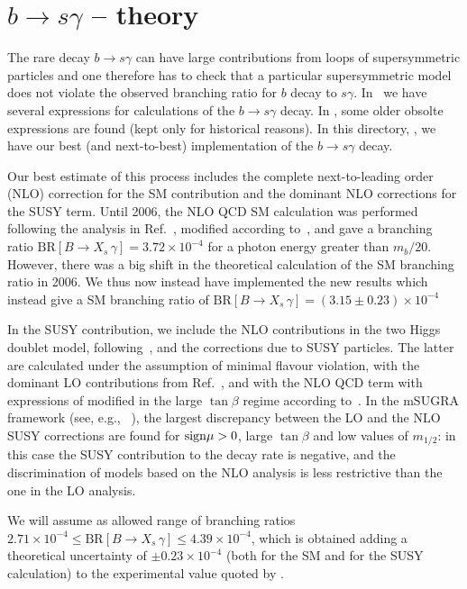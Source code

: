 
\section{$b \rightarrow s \gamma$ -- theory}

The rare decay $b \rightarrow s \gamma$ can have large contributions
from loops of supersymmetric particles and one therefore has to check
that a particular supersymmetric model does not violate the observed
branching ratio for $b$ decay to $s \gamma$. In \ds\ we have several
expressions for calculations of the $b \rightarrow s \gamma$ decay. In
, some older obsolte expressions are found
(kept only for historical reasons). In this directory, 
, we have our best (and next-to-best)
implementation of the $b \rightarrow s \gamma$ decay.

Our best estimate of this process includes the
complete next-to-leading 
order (NLO) correction for the SM contribution and the dominant
NLO corrections for the SUSY term.  Until 2006, the NLO QCD SM calculation
was performed following the analysis in Ref.~\cite{bsgsm},
modified according to~\cite{bsgmagic}, 
and gave a branching ratio 
$\mathrm{BR}[B\rightarrow X_s\,\gamma] =3.72\times10^{-4}$ 
for a photon energy greater than  $m_b/20$. 
However, there was a big shift in the
theoretical calculation of the SM branching ratio in 2006. We thus now instead
have implemented the new results \cite{bsg2006} which instead give a SM 
branching ratio of $\mathrm{BR}[B\rightarrow X_s\,\gamma] =(3.15 \pm 0.23) \times10^{-4}$ 

In the SUSY contribution, we 
include the NLO contributions in the two Higgs doublet model,
following~\cite{bsgh2}, and the corrections due to SUSY particles. The latter
are calculated under the assumption of minimal flavour violation, with the 
dominant LO contributions from Ref.~\cite{bsgtan}, and with the NLO QCD term
with expressions of \cite{bsgsusy} modified in the large $\tan\beta$ regime
according to~\cite{bsgtan}. In the mSUGRA framework
(see, e.g., ~\cite{bsgcompare}), the largest discrepancy 
between the LO and the NLO SUSY corrections are found for ${\rm sign}{\mu}>0$, 
large $\tan\beta$ and low values of $m_{1/2}$: in this case the SUSY 
contribution to the decay rate is negative, and the discrimination of models 
based on the NLO analysis is less restrictive than the one in the LO analysis.

We will assume as allowed range of branching ratios
$2.71\times10^{-4}\leq\mathrm{BR}[B\rightarrow X_s\,\gamma] \leq4.39\times10^{-4}$,
which is obtained adding a theoretical uncertainty of 
$\pm 0.23 \times10^{-4}$ (both for the SM and for the SUSY calculation) to the
experimental value quoted by \cite{Barbiero-bsg2007}.

